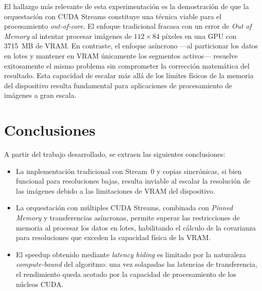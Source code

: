 \documentclass[12pt, a4paper]{article}
\begin{document}
El hallazgo más relevante de esta experimentación es la demostración de que la
orquestación con CUDA Streams constituye una técnica viable para el
procesamiento \textit{out-of-core}. El enfoque tradicional fracasa con un error
de \textit{Out of Memory} al intentar procesar imágenes de $112 \times 84$
píxeles en una GPU con 3715~MB de VRAM. En contraste, el enfoque asíncrono
---al particionar los datos en lotes y mantener en VRAM únicamente los
segmentos activos--- resuelve exitosamente el mismo problema sin comprometer la
corrección matemática del resultado. Esta capacidad de escalar más allá de los
límites físicos de la memoria del dispositivo resulta fundamental para
aplicaciones de procesamiento de imágenes a gran escala.

\section{Conclusiones}

A partir del trabajo desarrollado, se extraen las siguientes conclusiones:

\begin{itemize}
    \item La implementación tradicional con Stream~0 y copias sincrónicas,
    si bien funcional para resoluciones bajas, resulta inviable al escalar la
    resolución de las imágenes debido a las limitaciones de VRAM del
    dispositivo.

    \item La orquestación con múltiples CUDA Streams, combinada con
    \textit{Pinned Memory} y transferencias asíncronas, permite superar las
    restricciones de memoria al procesar los datos en lotes, habilitando el
    cálculo de la covarianza para resoluciones que exceden la capacidad física
    de la VRAM.

    \item El speedup obtenido mediante \textit{latency hiding} es limitado
    por la naturaleza \textit{compute-bound} del algoritmo: una vez solapadas
    las latencias de transferencia, el rendimiento queda acotado por la
    capacidad de procesamiento de los núcleos CUDA.

\end{itemize}
\end{document}
